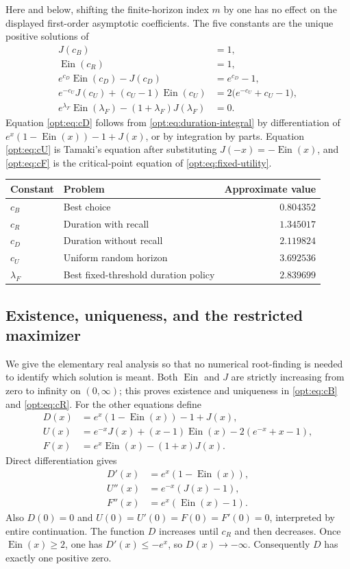 \documentclass[11pt,a4paper]{article}
\DeclareMathOperator{\Ein}{Ein}
\theoremstyle{definition}
\theoremstyle{remark}
\numberwithin{equation}{section}
\begin{document}
Here and below, shifting the finite-horizon index $m$ by one has no
effect on the displayed first-order asymptotic coefficients.
The five constants are the unique positive solutions of
\begin{align}
 J(c_B)&=1,\label{opt:eq:cB}\\
 \Ein(c_R)&=1,\label{opt:eq:cR}\\
 e^{c_D}\Ein(c_D)-J(c_D)&=e^{c_D}-1,\label{opt:eq:cD}\\
 e^{-c_U}J(c_U)+(c_U-1)\Ein(c_U)
   &=2\bigl(e^{-c_U}+c_U-1\bigr),\label{opt:eq:cU}\\
 e^{\lambda_F}\Ein(\lambda_F)-(1+\lambda_F)J(\lambda_F)&=0.
 \label{opt:eq:cF}
\end{align}
Equation \eqref{opt:eq:cD} follows from \eqref{opt:eq:duration-integral}
by differentiation of $e^x(1-\Ein(x))-1+J(x)$, or by integration by parts.
Equation \eqref{opt:eq:cU} is Tamaki's equation after substituting
$J(-x)=-\Ein(x)$, and \eqref{opt:eq:cF} is the critical-point equation of
\eqref{opt:eq:fixed-utility}.

\begin{center}
\begin{tabular}{llr}
\toprule
Constant&Problem&Approximate value\\
\midrule
$c_B$&Best choice&$0.804352$\\
$c_R$&Duration with recall&$1.345017$\\
$c_D$&Duration without recall&$2.119824$\\
$c_U$&Uniform random horizon&$3.692536$\\
$\lambda_F$&Best fixed-threshold duration policy&$2.839699$\\
\bottomrule
\end{tabular}
\end{center}

\subsection{Existence, uniqueness, and the restricted maximizer}

We give the elementary real analysis so that no numerical root-finding
is needed to identify which solution is meant. Both $\Ein$ and $J$ are
strictly increasing from zero to infinity on $(0,\infty)$; this proves
existence and uniqueness in \eqref{opt:eq:cB} and \eqref{opt:eq:cR}.
For the other equations define
\begin{align*}
 D(x)&=e^x(1-\Ein(x))-1+J(x),\\
 U(x)&=e^{-x}J(x)+(x-1)\Ein(x)-2(e^{-x}+x-1),\\
 F(x)&=e^x\Ein(x)-(1+x)J(x).
\end{align*}
Direct differentiation gives
\begin{align*}
 D'(x)&=e^x(1-\Ein(x)),\\
 U''(x)&=e^{-x}(J(x)-1),\\
 F''(x)&=e^x(\Ein(x)-1).
\end{align*}
Also $D(0)=0$ and
$U(0)=U'(0)=F(0)=F'(0)=0$, interpreted by entire continuation.
The function $D$ increases until $c_R$ and then decreases.
Once $\Ein(x)\ge2$, one has $D'(x)\le-e^x$, so $D(x)\to-\infty$.
Consequently $D$ has exactly one positive zero.
\end{document}
